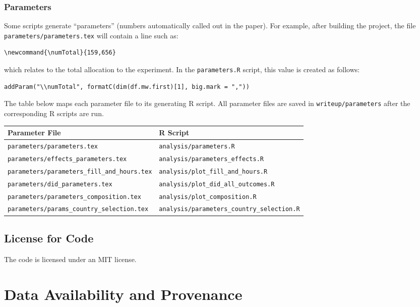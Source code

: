 \documentclass[10pt]{article}
\newenvironment{eightpt}{\begingroup\fontsize{8}{12.5}\selectfont}{\endgroup}
\begin{document}
\subsubsection{Parameters}
Some scripts generate “parameters” (numbers automatically called out in the paper). For example, after building the project, the file \texttt{parameters/parameters.tex} will contain a line such as:
\begin{verbatim}
\newcommand{\numTotal}{159,656}
\end{verbatim}
which relates to the total allocation to the experiment. In the \texttt{parameters.R} script, this value is created as follows:
\begin{verbatim}
addParam("\\numTotal", formatC(dim(df.mw.first)[1], big.mark = ","))
\end{verbatim}
The table below maps each parameter file to its generating R script. All parameter files are saved in \texttt{writeup/parameters} after the corresponding R scripts are run.

\begin{eightpt}
\begin{tabularx}{\textwidth}{@{}LL@{}}
\toprule
Parameter File & R Script \\
\midrule
\texttt{parameters/parameters.tex} & \texttt{analysis/parameters.R} \\
\texttt{parameters/effects\_parameters.tex} & \texttt{analysis/parameters\_effects.R} \\
\texttt{parameters/parameters\_fill\_and\_hours.tex} & \texttt{analysis/plot\_fill\_and\_hours.R} \\
\texttt{parameters/did\_parameters.tex} & \texttt{analysis/plot\_did\_all\_outcomes.R} \\
\texttt{parameters/parameters\_composition.tex} & \texttt{analysis/plot\_composition.R} \\
\texttt{parameters/params\_country\_selection.tex} & \texttt{analysis/parameters\_country\_selection.R} \\
\bottomrule
\end{tabularx}
\end{eightpt}

\subsection{License for Code}
The code is licensed under an MIT license.

\section{Data Availability and Provenance}
\end{document}
